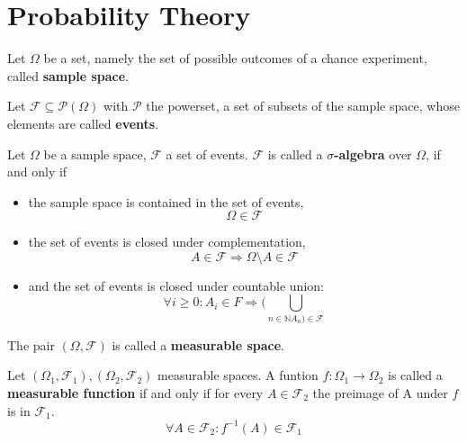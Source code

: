         \begin{theorem}
         
        \end{theorem}
        
        \begin{definition}
        \end{definition}
        
 
        

    \section{Probability Theory}\label{\positionnumber}
        \begin{definition}
        Let $\Omega$ be a set, namely the set of possible outcomes of a chance experiment, called \textbf{sample space}.
        
        Let $\mathcal{F} \subseteq \mathcal{P}(\Omega)$ with $\mathcal{P}$ the powerset, a set of subsets of the sample space, whose elements are called \textbf{events}.
        
        Let $\Omega$ be a sample space, $\mathcal{F}$ a set of events.
        $\mathcal{F}$ is called a \textbf{$\sigma$-algebra} over $\Omega$, if and only if
        \begin{itemize}
        \item the sample space is contained in the set of events,
        \[ \Omega \in \mathcal{F} \]
        \item the set of events is closed under complementation,
        \[ A \in \mathcal{F} \Rightarrow \Omega \setminus A \in \mathcal F \]
        \item and the set of events is closed under countable union:
        \[ \forall i \geq 0: A_i \in F \Rightarrow (\bigcup_{n \in \mathbb{N} A_n) \in \mathcal{F}} \]
        \end{itemize}
        
        The pair $\left( \Omega, \mathcal{F} \right)$ is called a \textbf{measurable space}.

        Let $\left( \Omega_1, \mathcal{F}_1 \right), \left( \Omega_2, \mathcal{F}_2 \right)$ measurable spaces. A funtion $f: \Omega_1 \rightarrow \Omega_2$ is called a \textbf{measurable function} if and only if for every $A \in \mathcal{F}_2$ the preimage of A under $f$ is in $\mathcal{F}_1$.
        \[ \forall A \in \mathcal{F}_2: f^{-1}(A) \in \mathcal{F}_1 \]
        \end{definition}

